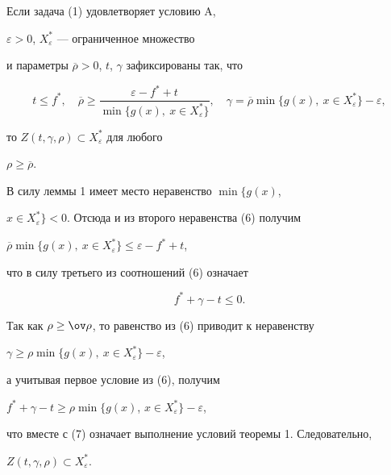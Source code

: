 \begin{cor}


Если задача (1) удовлетворяет условию A,


$\varepsilon>0$, $X_{\varepsilon}^*$ --- ограниченное множество 


и параметры $\overline{\rho}>0$, $t$, $\gamma$ зафиксированы так, что 


\begin{equation}


t\le f^*,\quad \overline{\rho}\ge\frac{\varepsilon-f^*+t}{\min\{g(x),\ x\in


X_{\varepsilon}^*\}}, \quad \gamma=\overline{\rho}\min\{g(x),\ x\in


X_{\varepsilon}^*\}-\varepsilon,


\end{equation}


то $Z(t,\gamma,\rho)\subset X_{\varepsilon}^*$ для любого


$\rho\ge\overline{\rho}$.


\end{cor}





\begin{pf}


В силу леммы 1 имеет место неравенство $\min\{g(x)$,


$x\in X_{\varepsilon}^*\}<0$. Отсюда и из второго неравенства (6) получим


$\overline{\rho}\min\{g(x),\ x\in X_{\varepsilon}^*\}\le\varepsilon-f^*+t$, 


что в силу третьего из соотношений (6) означает


\begin{equation}


f^*+\gamma-t\le 0.


\end{equation}


Так как $\rho\ge\ov\rho$, то равенство из (6) приводит к неравенству


$\gamma\ge\rho\min\{g(x),\ x\in X^*_\varepsilon\}-\varepsilon$,


а учитывая первое условие из (6), получим


$f^*+\gamma-t\ge\rho\min\{g(x)$, $x\in X_{\varepsilon}^*\}-\varepsilon$,


что вместе с (7) означает выполнение условий теоремы 1. Следовательно, 


$Z(t,\gamma,\rho)\subset X_{\varepsilon}^*$.


\end{pf}





